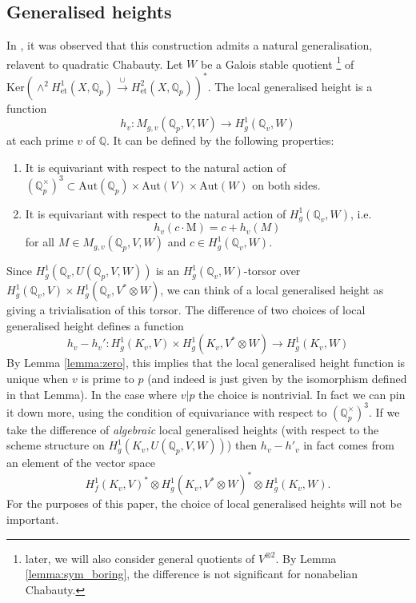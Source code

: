 \documentclass[11pt]{amsart}
\def\Q{\mathbb Q}
\newcommand{\M}{\mathrm{M}}
\def\Aut{\mathrm{Aut}}
\theoremstyle{plain}
\theoremstyle{definition}
\newcommand{\Ker}{\mathrm{Ker}}
\newcommand{\et}{\mathrm{et}}
\begin{document}
\subsection{Generalised heights}
In \cite{QC2}, it was observed that this construction admits a natural generalisation, relavent to quadratic Chabauty. Let $W$ be a Galois stable quotient \footnote{later, we will also consider general quotients of $V^{\otimes 2}$. By Lemma \ref{lemma:sym_boring}, the difference is not significant for nonabelian Chabauty.} of $\Ker (\wedge ^2 H^1 _{\et }(X,\Q _p ) \stackrel{\cup }{\longrightarrow } H^2 _{\et }(X,\Q _p ))^* $. The local generalised height is a function
\[
h_v :M_{g,v}(\Q _p ,V,W)\to H^1 _g (\Q _v ,W)
\]
at each prime $v$ of $\Q $. It can be defined by the following properties:
\begin{enumerate}
\item It is equivariant with respect to the natural action of $(\Q _p ^\times )^3 \subset \Aut (\Q _p )\times \Aut (V)\times  \Aut (W)$ on both sides.
\item It is equivariant with respect to the natural action of $H^1 _g (\Q _v ,W)$, i.e.
\[
h_v (c\cdot \M)=c+h_v (M)
\]
for all $M\in M_{g,v}(\Q _p ,V,W)$ and $c\in H^1 _g (\Q _v ,W)$.
\end{enumerate}
Since $H^1 _g (\Q _v ,U(\Q _p ,V,W))$ is an $H^1 _g (\Q _v ,W)$-torsor over $H^1 _g (\Q _v ,V)\times H^1 _g (\Q _v ,V^* \otimes W)$, we can think of a local generalised height as giving a trivialisation of this torsor. The difference of two choices of local generalised height defines a function
\begin{equation}\label{eqn:alg}
h_v -h_v ' :H^1 _g (K _v ,V)\times H^1 _g (K _v ,V^* \otimes W)\to H^1 _g (K _v ,W)
\end{equation}
By Lemma \ref{lemma:zero}, this implies that the local generalised height function is unique when $v$ is prime to $p$ (and indeed is just given by the isomorphism defined in that Lemma). In the case where $v|p$ the choice is nontrivial. In fact we can pin it down more, using the condition of equivariance with respect to $(\Q _p ^\times )^3 $. If we take the difference of \textit{algebraic} local generalised heights (with respect to the scheme structure on $H^1 _g (K_v ,U(\Q _p ,V,W))$) then $h_v -h'_v$ in fact comes from an element of the vector space
\[
H^1 _f (K _v ,V)^* \otimes H^1 _g (K _v ,V^* \otimes W)^* \otimes H^1 _g (K _v ,W).
\]
For the purposes of this paper, the choice of local generalised heights will not be important.
\end{document}
